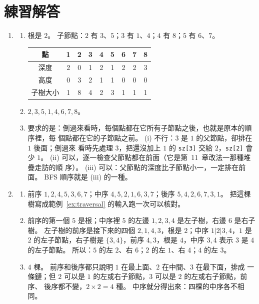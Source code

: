 \section*{練習解答}

\begin{enumerate}
\item
\begin{enumerate}
\item 根是 $2$。 子節點：$2$ 有 $3$、$5$；$3$ 有 $1$、$4$；$4$ 有 $8$；$5$ 有
$6$、$7$。
\begin{center}
\begin{tabular}{c|cccccccc}
\toprule
點 & 1 & 2 & 3 & 4 & 5 & 6 & 7 & 8 \\
\midrule
深度 & 2 & 0 & 1 & 2 & 1 & 2 & 2 & 3 \\
高度 & 0 & 3 & 2 & 1 & 1 & 0 & 0 & 0 \\
子樹大小 & 1 & 8 & 4 & 2 & 3 & 1 & 1 & 1 \\
\bottomrule
\end{tabular}
\end{center}
\item $2, 3, 5, 1, 4, 6, 7, 8$。
\item 要求的是：倒過來看時，每個點都在它所有子節點之後，也就是原本的順序裡，每
個點都在它的子節點之前。 (i) 不行：$3$ 是 $1$ 的父節點，卻排在 $1$ 後面；倒過來
看時先處理 $3$，把還沒加上 $1$ 的 \texttt{sz[3]} 交給 $2$，\texttt{sz[2]} 會少
$1$。 (ii) 可以，逐一檢查父節點都在前面（它是第~11~章改法一那種堆疊走訪的順
序）。 (iii) 可以：父節點的深度比子節點小一，一定排在前面。 BFS 順序就是 (iii)
的一種。
\end{enumerate}

\item
\begin{enumerate}
\item 前序 $1, 2, 4, 5, 3, 6, 7$；中序 $4, 5, 2, 1, 6, 3, 7$；後序 $5, 4, 2, 6,
7, 3, 1$。 把這棵樹寫成範例~\ref{ex:traversal} 的輸入跑一次可以核對。
\item 前序的第一個 $5$ 是根；中序裡 $5$ 的左邊 $1, 2, 3, 4$ 是左子樹，右邊 $6$
是右子樹。 左子樹的前序是接下來的四個 $2, 1, 4, 3$，根是 $2$；中序 $1 | 2 | 3,
4$，$1$ 是 $2$ 的左子節點，右子樹是 $\{3, 4\}$，前序 $4, 3$，根是 $4$，中序 $3,
4$ 表示 $3$ 是 $4$ 的左子節點。 所以：$5$ 的左 $2$、右 $6$；$2$ 的左 $1$、右
$4$；$4$ 的左 $3$。
\item $4$ 棵。 前序和後序都只說明 $1$ 在最上面、$2$ 在中間、$3$ 在最下面，排成
一條鏈；但 $2$ 可以是 $1$ 的左或右子節點，$3$ 可以是 $2$ 的左或右子節點，前序、
後序都不變，$2 \times 2 = 4$ 種。 中序就分得出來：四棵的中序各不相同。
\end{enumerate}


\end{enumerate}
